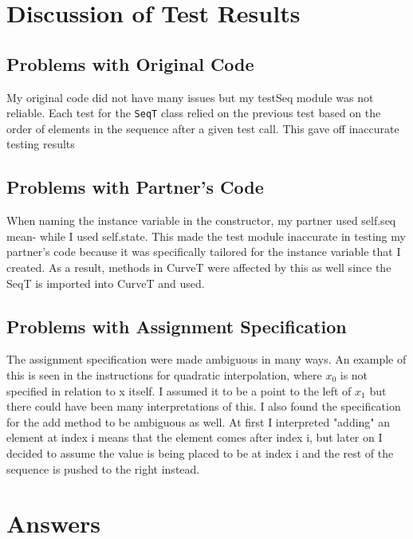 \documentclass[12pt]{article}
\begin{document}
\section{Discussion of Test Results}

\subsection{Problems with Original Code}
My original code did not have many issues but my testSeq module was not reliable. Each test for the \texttt{SeqT} class relied on the previous test based on the order of elements in the sequence after a given test call. This gave off inaccurate testing results

\subsection{Problems with Partner's Code}
When naming the instance variable in the constructor, my partner used self.seq mean- while I used self.state. This made the test module inaccurate in testing my partner’s code because it was specifically tailored for the instance variable that I created. As a result, methods in CurveT were affected by this as well since the SeqT is imported into CurveT and used.

\subsection{Problems with Assignment Specification}

The assignment specification were made ambiguous in many ways. An example of this is seen in the instructions for quadratic interpolation, where $x_{0}$ is not specified in relation to x itself. I assumed it to be a point to the left of $x_1$ but there could have been many interpretations of this. I also found the specification for the add method to be ambiguous as well. At first I interpreted "adding" an element at index i means that the element comes after index i, but later on I decided to assume the value is being placed to be at index i and the rest of the sequence is pushed to the right instead.

\section{Answers}
\end{document}
